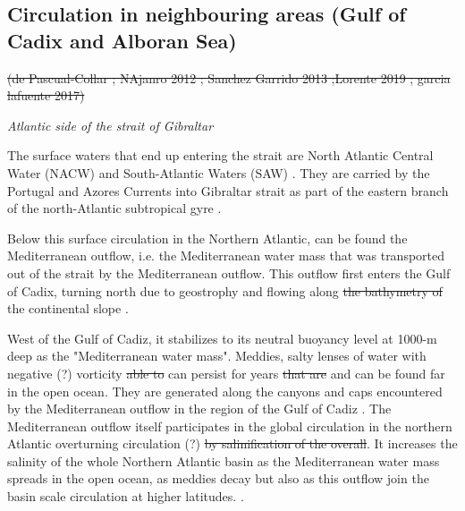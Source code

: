 \subsection{Circulation in neighbouring areas (Gulf of Cadix and Alboran Sea)}

 \color{blue}\sout{(de Pascual-Collar ; NAjanro 2012 ; Sanchez Garrido 2013 ;Lorente 2019 ; garcia lafuente 2017)} 
 \color{black}

\textit{Atlantic side \color{blue}of the strait of Gibraltar \color{black}}

The surface waters that end up entering the strait are \color{blue} North Atlantic Central Water (NACW) \color{black} and South-Atlantic Waters (SAW) \color{black} \citep{millot_2014,naranjo_2015}. They are carried by the Portugal and Azores Currents into  \color{blue}Gibraltar strait \color{black} as part of the eastern branch of the north-Atlantic subtropical gyre \citep{barton_2001}.

Below this surface circulation \color{blue} in the Northern Atlantic\color{black}, can \color{blue}be found \color{black} the Mediterranean outflow, \color{blue} i.e. \color{black}the Mediterranean water mass that was transported out of the strait by the Mediterranean outflow. \color{blue}This outflow first enters \color{black} the Gulf of Cadix,  \color{blue}turning \color{black} north due to geostrophy and flowing along \sout{the bathymetry of} the continental slope \citep{price_1993,gasser_2017}. 

\color{blue} West of the Gulf of Cadiz, it \color{black} stabilizes to its neutral buoyancy level at \color{blue} 1000-m deep \color{black} as the "Mediterranean water mass"\citep{price_1993}. Meddies, salty lenses of water with negative  \color{blue}(?) \color{black} vorticity \sout{able to} \color{blue}can  \color{black} persist for years \sout{that are} \color{blue} and can be found \color{black} far in the open ocean. \color{blue}They \color{black} are generated along the canyons and caps encountered by the Mediterranean outflow in the region of the Gulf of Cadiz \citep{bashmachnikov_2015}. The Mediterranean outflow itself participates in the global circulation \color{blue}in the \color{blue}northern Atlantic \color{black} overturning circulation \color{blue}(?) \color{black} \sout{by salinification of the overall}. \color{blue} It increases the salinity of the whole Northern Atlantic basin as the Mediterranean water mass spreads in the open ocean, as meddies decay but also as this outflow join the basin scale circulation at higher latitudes. \color{black} \citep{price_1993,jia_2007}.\\


